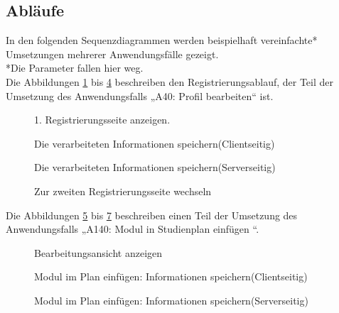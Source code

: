 \subsection{Abläufe}

In den folgenden Sequenzdiagrammen werden beispielhaft vereinfachte* Umsetzungen mehrerer Anwendungsfälle gezeigt.\\
*Die Parameter fallen hier weg.\\

Die Abbildungen \ref{seq:register_1} bis \ref{seq:register_4} beschreiben den Registrierungsablauf, der Teil der Umsetzung des Anwendungsfalls „A40: Profil bearbeiten“ ist.

\begin{figure}[H]
	
	\caption{1. Registrierungsseite anzeigen.}
	\label{seq:register_1}
\end{figure}

\begin{figure}[H]
	
	\caption{Die verarbeiteten Informationen speichern(Clientseitig)}
	\label{seq:register_2}
\end{figure}

\begin{figure}[H]
	
	\caption{Die verarbeiteten Informationen speichern(Serverseitig)}
	\label{seq:register_3}
\end{figure}

\begin{figure}[H]
	
	\caption{Zur zweiten Registrierungsseite wechseln}
	\label{seq:register_4}
\end{figure}

Die Abbildungen \ref{seq:addmodul_1} bis \ref{seq:addmodul_3} beschreiben einen Teil der Umsetzung des Anwendungsfalls „A140: Modul in Studienplan einfügen “.

\begin{figure}[H]
	
	\caption{Bearbeitungsansicht anzeigen}
	\label{seq:addmodul_1}
\end{figure}

\begin{figure}[H]
	
	\caption{Modul im Plan einfügen: Informationen speichern(Clientseitig)}
	\label{seq:addmodul_2}
\end{figure}

\begin{figure}[H]
	
	\caption{Modul im Plan einfügen: Informationen speichern(Serverseitig)}
	\label{seq:addmodul_3}
\end{figure}

